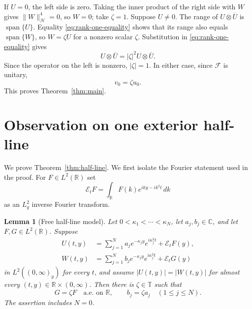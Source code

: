 \documentclass[11pt]{amsart}
\newtheorem{lemma}[theorem]{Lemma}
\numberwithin{equation}{section}
\theoremstyle{remark}
\newcommand{\R}{\mathbb R}
\newcommand{\C}{\mathbb C}
\newcommand{\T}{\mathbb T}
\newcommand{\HH}{\mathcal H}
\begin{document}
If $U=0$, the left side is zero.  Taking the inner product of the right side
with $W$ gives $\|W\|_{\HH}^4=0$, so $W=0$; take $\zeta=1$.  Suppose
$U\ne0$.  The range of $U\otimes\overline U$ is $\operatorname{span}\{U\}$.
Equality \eqref{eq:rank-one-equality} shows that its range also equals
$\operatorname{span}\{W\}$, so $W=\zeta U$ for a nonzero scalar $\zeta$.
Substitution in \eqref{eq:rank-one-equality} gives
\[
 U\otimes\overline U=|\zeta|^2U\otimes\overline U.
\]
Since the operator on the left is nonzero, $|\zeta|=1$.  In either case,
since $\mathcal F$ is unitary,
\[
 v_0=\zeta u_0.
\]
This proves Theorem~\ref{thm:main}.


\section{Observation on one exterior half-line}\label{sec:half-line}

We prove Theorem~\ref{thm:half-line}.  We first isolate the Fourier statement
used in the proof.  For $F\in L^2(\R)$ set
\[
 \mathcal E_tF=\int_\R F(k)e^{ik y-ik^2t}\,dk
\]
as an $L^2_y$ inverse Fourier transform.

\begin{lemma}[Free half-line model]
\label{lem:free-half-line}
Let $0<\kappa_1<\cdots<\kappa_N$, let $a_j,b_j\in\C$, and let
$F,G\in L^2(\R)$.  Suppose
\begin{align*}
 U(t,y)&=\sum_{j=1}^N a_j e^{-\kappa_j y}e^{i\kappa_j^2t}
          +\mathcal E_t F(y),\\
 W(t,y)&=\sum_{j=1}^N b_j e^{-\kappa_j y}e^{i\kappa_j^2t}
          +\mathcal E_t G(y)
\end{align*}
in $L^2((0,\infty)_y)$ for every $t$, and assume
$|U(t,y)|=|W(t,y)|$ for almost every $(t,y)\in\R\times(0,\infty)$.
Then there is $\zeta\in\T$ such that
\[
 G=\zeta F\quad\text{a.e. on }\R,
 \qquad b_j=\zeta a_j\quad(1\le j\le N).
\]
The assertion includes $N=0$.
\end{lemma}
\end{document}
